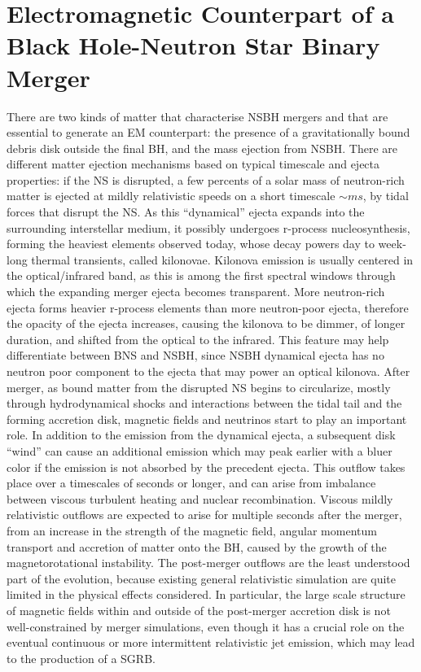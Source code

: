 \documentclass[binding=0.6cm, LaM]{sapthesis}
\begin{document}
\section{Electromagnetic Counterpart of a Black Hole-Neutron Star Binary Merger}
	There are two kinds of matter that characterise NSBH mergers and that are essential to generate an EM counterpart: 
	the presence of a gravitationally bound debris disk outside the final BH, and the mass ejection from NSBH.
	There are different matter ejection mechanisms based on typical timescale and ejecta properties: 
	if the NS is disrupted, a few percents of a solar mass of neutron-rich matter is
	ejected at mildly relativistic speeds on a short timescale $\sim ms$, by tidal forces that disrupt the NS.
	As this “dynamical” ejecta expands into the surrounding interstellar medium, it possibly undergoes r-process nucleosynthesis, 
	forming the heaviest elements observed today, whose decay powers day to week-long thermal transients, called kilonovae.
	Kilonova emission is usually centered in the optical/infrared band, as this is among the first spectral windows 
	through which the expanding merger ejecta becomes transparent. 
	More neutron-rich ejecta forms heavier r-process elements than more neutron-poor ejecta, 
	therefore the opacity of the ejecta increases, causing the kilonova to be dimmer, of longer duration, 
	and shifted from the optical to the infrared.
	This feature may help differentiate between BNS and NSBH, since NSBH dynamical ejecta has no neutron poor component to the ejecta that may power an optical kilonova.	
	After merger, as bound matter from the disrupted NS begins to circularize, mostly through hydrodynamical shocks 
	and interactions between the tidal tail and the forming accretion disk, magnetic fields and neutrinos start to play an important role. 
	In addition to the emission from the dynamical ejecta, a subsequent disk “wind” can cause an additional emission 
	which may peak earlier with a bluer color if the emission is not absorbed by the precedent ejecta. 
	This outflow takes place over a timescales of seconds or longer, and 
	can arise from imbalance between viscous turbulent heating and nuclear recombination.
	Viscous mildly relativistic outflows are expected to arise for multiple seconds after the merger, 	
	from an increase in the strength of the magnetic field, angular momentum transport and accretion of matter onto the BH,
 	caused by the growth of the magnetorotational instability.
	The post-merger outflows are the least understood part of the evolution, 
	because existing general relativistic simulation are quite limited in the physical effects considered. 
	In particular, the large scale structure of magnetic fields within and outside of the post-merger accretion disk 
	is not well-constrained by merger simulations, even though it has a crucial role on the eventual continuous or more intermittent relativistic jet emission, 
	which may lead to the production of a SGRB.
	
\end{document}
